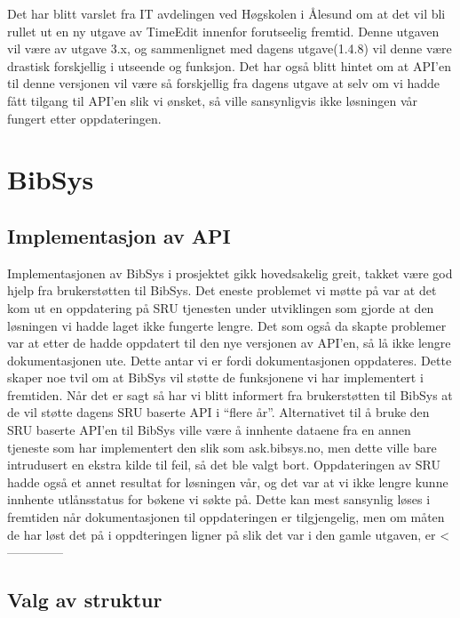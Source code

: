 \documentclass[../main.tex]{subfiles}
\begin{document}
Det har blitt varslet fra IT avdelingen ved Høgskolen i Ålesund om at det vil bli rullet ut en ny utgave av TimeEdit innenfor forutseelig fremtid. Denne utgaven vil være av utgave 3.x, og sammenlignet med dagens utgave(1.4.8) vil denne være drastisk forskjellig i utseende og funksjon. Det har også blitt hintet om at API’en til denne versjonen vil være så forskjellig fra dagens utgave at selv om vi hadde fått tilgang til API’en slik vi ønsket, så ville sansynligvis ikke løsningen vår fungert etter oppdateringen.

\section{BibSys}

\subsection{Implementasjon av API}

Implementasjonen av BibSys i prosjektet gikk hovedsakelig greit, takket være god hjelp fra brukerstøtten til BibSys. Det eneste problemet vi møtte på var at det kom ut en oppdatering på SRU tjenesten under utviklingen som gjorde at den løsningen vi hadde laget ikke fungerte lengre. Det som også da skapte problemer var at etter de hadde oppdatert til den nye versjonen av API’en, så lå ikke lengre dokumentasjonen ute. Dette antar vi er fordi dokumentasjonen oppdateres. Dette skaper noe tvil om at BibSys vil støtte de funksjonene vi har implementert i fremtiden. Når det er sagt så har vi blitt informert fra brukerstøtten til BibSys at de vil støtte dagens SRU baserte API i “flere år”.
Alternativet til å bruke den SRU baserte API’en til BibSys ville være å innhente dataene fra en annen tjeneste som har implementert den slik som ask.bibsys.no, men dette ville bare intrudusert en ekstra kilde til feil, så det ble valgt bort.\newline 
Oppdateringen av SRU hadde også et annet resultat for løsningen vår, og det var at vi ikke lengre kunne innhente utlånsstatus for bøkene vi søkte på. Dette kan mest sansynlig løses i fremtiden når dokumentasjonen til oppdateringen er tilgjengelig, men om måten de har løst det på i oppdteringen ligner på slik det var i den gamle utgaven, er <--------------

\subsection{Valg av struktur}
\end{document}
